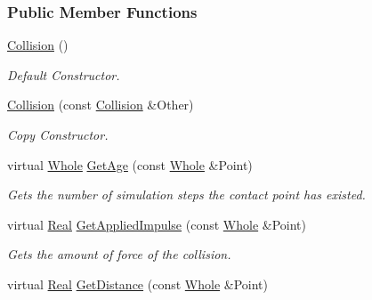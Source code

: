 \subsubsection*{Public Member Functions}
\begin{DoxyCompactItemize}
\item 
\hypertarget{classMezzanine_1_1Collision_a2eeacd2ab527b1d5e414917db41d580b}{
\hyperlink{classMezzanine_1_1Collision_a2eeacd2ab527b1d5e414917db41d580b}{Collision} ()}
\label{classMezzanine_1_1Collision_a2eeacd2ab527b1d5e414917db41d580b}

\begin{DoxyCompactList}\small\item\em Default Constructor. \item\end{DoxyCompactList}\item 
\hyperlink{classMezzanine_1_1Collision_a1170d2c2e674ab3e9b1bf68c91171db4}{Collision} (const \hyperlink{classMezzanine_1_1Collision}{Collision} \&Other)
\begin{DoxyCompactList}\small\item\em Copy Constructor. \item\end{DoxyCompactList}\item 
virtual \hyperlink{namespaceMezzanine_adcbb6ce6d1eb4379d109e51171e2e493}{Whole} \hyperlink{classMezzanine_1_1Collision_ad9d72f1d883214242803b72d1b82c343}{GetAge} (const \hyperlink{namespaceMezzanine_adcbb6ce6d1eb4379d109e51171e2e493}{Whole} \&Point)
\begin{DoxyCompactList}\small\item\em Gets the number of simulation steps the contact point has existed. \item\end{DoxyCompactList}\item 
virtual \hyperlink{namespaceMezzanine_a726731b1a7df72bf3583e4a97282c6f6}{Real} \hyperlink{classMezzanine_1_1Collision_aa53aa5016ea75885b9be4f317968b407}{GetAppliedImpulse} (const \hyperlink{namespaceMezzanine_adcbb6ce6d1eb4379d109e51171e2e493}{Whole} \&Point)
\begin{DoxyCompactList}\small\item\em Gets the amount of force of the collision. \item\end{DoxyCompactList}\item 
virtual \hyperlink{namespaceMezzanine_a726731b1a7df72bf3583e4a97282c6f6}{Real} \hyperlink{classMezzanine_1_1Collision_a365b382bac319b1258369c9bdeeb5048}{GetDistance} (const \hyperlink{namespaceMezzanine_adcbb6ce6d1eb4379d109e51171e2e493}{Whole} \&Point)

\end{DoxyCompactItemize}

